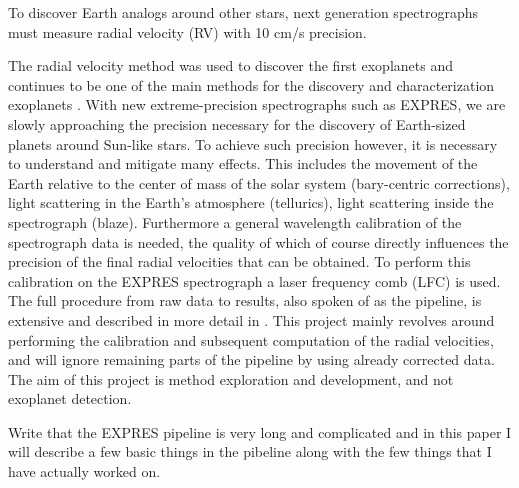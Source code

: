 
To discover Earth analogs around other stars, next generation spectrographs must measure radial velocity (RV) with 10 cm/s precision.

The radial velocity method was used to discover the first exoplanets and continues to be one of the main methods for the discovery and characterization exoplanets \cite{radial_velocity_techniques}. With new extreme-precision spectrographs such as EXPRES, we are slowly approaching the precision necessary for the discovery of Earth-sized planets around Sun-like stars. To achieve such precision however, it is necessary to understand and mitigate many effects. This includes the movement of the Earth relative to the center of mass of the solar system (bary-centric corrections), light scattering in the Earth's atmosphere (tellurics), light scattering inside the spectrograph (blaze). Furthermore a general wavelength calibration of the spectrograph data is needed, the quality of which of course directly influences the precision of the final radial velocities that can be obtained. To perform this calibration on the EXPRES spectrograph a laser frequency comb (LFC) is used. The full procedure from raw data to results, also spoken of as the pipeline, is extensive and described in more detail in \cite{first_RV_from_EXPRES}. This project mainly revolves around performing the calibration and subsequent computation of the radial velocities, and will ignore remaining parts of the pipeline by using already corrected data. The aim of this project is method exploration and development, and not exoplanet detection.

\vspace{0.5cm}
\todo{} Write that the EXPRES pipeline is very long and complicated and in this paper I will describe a few basic things in the pibeline along with the few things that I have actually worked on.


